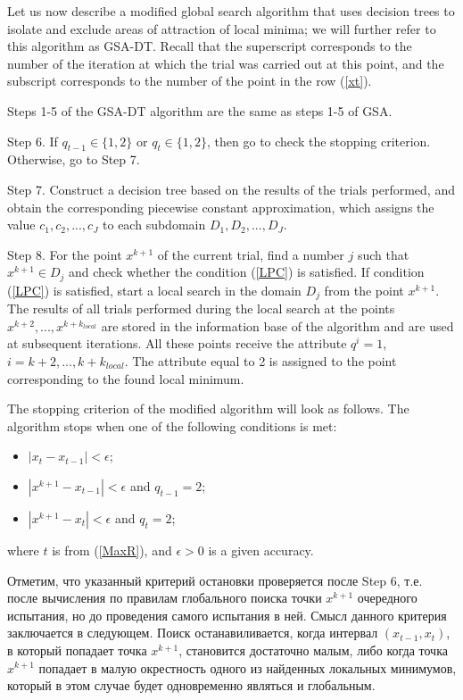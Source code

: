 \documentclass[entropy,article,submit,moreauthors,pdftex]{Definitions/mdpi}
\begin{document}
Let us now describe a modified global search algorithm that uses decision trees to isolate and exclude areas of attraction of local minima; we will further refer to this algorithm as GSA-DT. Recall that the superscript corresponds to the number of the iteration at which the trial was carried out at this point, and the subscript corresponds to the number of the point in the row  (\ref{xt}).

Steps 1-5 of the GSA-DT algorithm are the same as steps 1-5 of GSA.

Step 6. If $q_{t-1} \in \{1,2\}$ or $q_t \in \{1,2\}$, then go to check the stopping criterion. Otherwise, go to Step 7.

Step 7. Construct a decision tree based on the results of the trials performed, and obtain the corresponding piecewise constant approximation, which assigns the value $c_1, c_2, ..., c_J$ to each subdomain  $D_1, D_2, ..., D_J$.

Step 8. For the point $x^{k+1}$ of the current trial, find a number $j$ such that $x^{k+1} \in D_j$ and check whether the condition  (\ref{LPC}) is satisfied. If condition (\ref{LPC}) is satisfied, start a local search in the domain $D_j$ from the point  $x^{k+1}$. 
The results of all trials performed during the local search at the points $x^{k+2}, ...,x^{k+k_{local}}$ are stored in the information base of the algorithm and are used at subsequent iterations. 
All these points receive the attribute  $q^i=1$, $i = k+2, ... , k+k_{local}$. The attribute equal to 2 is assigned to the point corresponding to the found local minimum.

The stopping criterion of the modified algorithm will look as follows. 
The algorithm stops when one of the following conditions is met:

\begin{itemize}
	\item $|x_{t} - x_{t-1}|<\epsilon$;
	\item $|x^{k+1} - x_{t-1}|<\epsilon$ and $q_{t-1} = 2$;
	\item $|x^{k+1}-x_{t}|<\epsilon$ and $q_{t} = 2$;
\end{itemize}
where $t$ is from (\ref{MaxR}), and $\epsilon>0$ is a given accuracy.

Отметим, что указанный критерий остановки проверяется после Step 6, т.е. после вычисления по правилам глобального поиска точки $x^{k+1}$ очередного испытания, но до проведения самого испытания в ней. Смысл данного критерия заключается в следующем. Поиск останавиливается, когда интервал $(x_{t-1},x_t)$, в который попадает точка $x^{k+1}$, становится достаточно малым, либо когда точка $x^{k+1}$ попадает в малую окрестность одного из найденных локальных минимумов, который в этом случае будет одновременно являться и глобальным.
\end{document}
